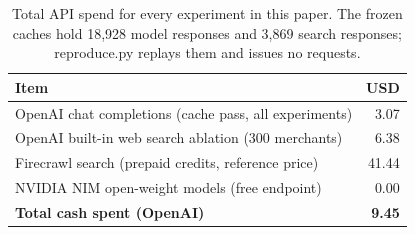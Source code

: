 \begin{table}[t]
\centering
\caption{Total API spend for every experiment in this paper. The frozen caches hold 18,928 model responses and 3,869 search responses; reproduce.py replays them and issues no requests.}
\label{tab:spend}
\begin{tabular}{lr}
\toprule
Item & USD\\
\midrule
OpenAI chat completions (cache pass, all experiments) & 3.07 \\
OpenAI built-in web search ablation (300 merchants) & 6.38 \\
Firecrawl search (prepaid credits, reference price) & 41.44 \\
NVIDIA NIM open-weight models (free endpoint) & 0.00 \\
\textbf{Total cash spent (OpenAI)} & \textbf{9.45} \\
\bottomrule
\end{tabular}
\end{table}
